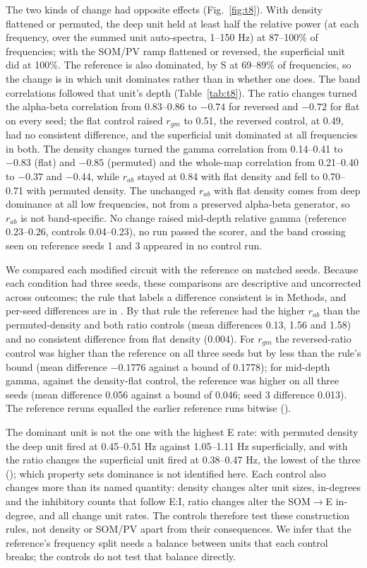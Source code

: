 The two kinds of change had opposite effects (Fig.~\ref{fig:t8}). With density flattened or permuted, the deep
unit held at least half the relative power (at each frequency, over the summed unit auto-spectra, 1--150 Hz) at 87--100\% of frequencies; with the SOM/PV ramp flattened or reversed, the superficial unit did at 100\%. The reference is also dominated, by S at 69--89\% of frequencies, so the change is in which unit dominates rather than in whether one does. The band correlations followed that unit's depth (Table~\ref{tab:t8}).
The ratio changes turned the alpha-beta correlation from 0.83--0.86 to $-0.74$ for reversed and $-0.72$ for flat on
every seed; the flat control raised $r_{gm}$ to 0.51, the reversed control, at 0.49, had no consistent difference, and the superficial unit dominated at all frequencies in both. The density
changes turned the gamma correlation from 0.14--0.41 to $-0.83$ (flat) and $-0.85$ (permuted) and the whole-map
correlation from 0.21--0.40 to $-0.37$ and $-0.44$, while $r_{ab}$ stayed at 0.84 with flat density and fell to
0.70--0.71 with permuted density. The unchanged $r_{ab}$ with flat density comes from deep dominance at all low
frequencies, not from a preserved alpha-beta generator, so $r_{ab}$ is not band-specific. No change raised
mid-depth relative gamma (reference 0.23--0.26, controls 0.04--0.23), no run passed the scorer, and the band
crossing seen on reference seeds 1 and 3 appeared in no control run.

We compared each modified circuit with the reference on matched seeds. Because each condition had three seeds,
these comparisons are descriptive and uncorrected across outcomes; the rule that labels a difference consistent
is in Methods, and per-seed differences are in . By that rule the reference had the higher $r_{ab}$ than
the permuted-density and both ratio controls (mean differences 0.13, 1.56 and 1.58) and no consistent difference
from flat density (0.004). For $r_{gm}$ the reversed-ratio control was higher than the reference on all three seeds
but by less than the rule's bound (mean difference $-0.1776$ against a bound of 0.1778); for mid-depth gamma, against the density-flat control, the reference was higher on all three seeds (mean difference 0.056 against a bound of 0.046; seed 3 difference 0.013). The reference reruns equalled the earlier reference runs bitwise ().

The dominant unit is not the one with the highest E rate: with permuted density the deep unit fired at 0.45--0.51
Hz against 1.05--1.11 Hz superficially, and with the ratio changes the superficial unit fired at 0.38--0.47 Hz, the
lowest of the three (); which property sets dominance is not identified here. Each control also changes
more than its named quantity: density changes alter unit sizes, in-degrees and the inhibitory counts that follow
E:I, ratio changes alter the SOM$\to$E in-degree, and all change unit rates. The controls therefore test these
construction rules, not density or SOM/PV apart from their consequences. We infer that the reference's frequency
split needs a balance between units that each control breaks; the controls do not test that balance directly.

